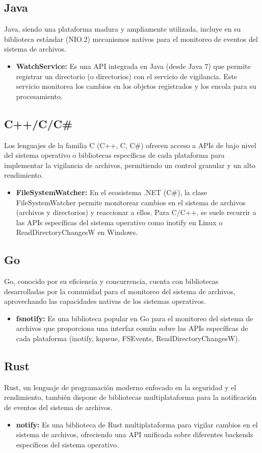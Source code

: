 \subsection{Java}
Java, siendo una plataforma madura y ampliamente utilizada, incluye en su biblioteca estándar (NIO.2) mecanismos nativos para el monitoreo de eventos del sistema de archivos.
\begin{itemize}
\item \textbf{WatchService:} Es una API integrada en Java (desde Java 7) que permite registrar un directorio (o directorios) con el servicio de vigilancia. Este servicio monitorea los cambios en los objetos registrados y los encola para su procesamiento.
\end{itemize}

\subsection{C++/C/C\#}
Los lenguajes de la familia C (C++, C, C\#) ofrecen acceso a APIs de bajo nivel del sistema operativo o bibliotecas específicas de cada plataforma para implementar la vigilancia de archivos, permitiendo un control granular y un alto rendimiento.
\begin{itemize}
\item \textbf{FileSystemWatcher:} En el ecosistema .NET (C\#), la clase FileSystemWatcher permite monitorear cambios en el sistema de archivos (archivos y directorios) y reaccionar a ellos. Para C/C++, se suele recurrir a las APIs específicas del sistema operativo como inotify en Linux o ReadDirectoryChangesW en Windows.
\end{itemize}

\subsection{Go}
Go, conocido por su eficiencia y concurrencia, cuenta con bibliotecas desarrolladas por la comunidad para el monitoreo del sistema de archivos, aprovechando las capacidades nativas de los sistemas operativos.
\begin{itemize}
\item \textbf{fsnotify:} Es una biblioteca popular en Go para el monitoreo del sistema de archivos que proporciona una interfaz común sobre las APIs específicas de cada plataforma (inotify, kqueue, FSEvents, ReadDirectoryChangesW).
\end{itemize}

\subsection{Rust}
Rust, un lenguaje de programación moderno enfocado en la seguridad y el rendimiento, también dispone de bibliotecas multiplataforma para la notificación de eventos del sistema de archivos.
\begin{itemize}
\item \textbf{notify:} Es una biblioteca de Rust multiplataforma para vigilar cambios en el sistema de archivos, ofreciendo una API unificada sobre diferentes backends específicos del sistema operativo.
\end{itemize}

